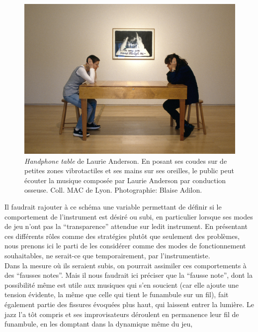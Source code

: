 \begin{figure}[!htbp]
	\captionsetup{format=plain}%
	\includegraphics[width=\linewidth]{gfx/03_gesture/laurie-anderson-the-handphone-table.jpg}
	\caption[\textit{Handphone table} de Laurie Anderson]{\textit{Handphone table} de Laurie Anderson. En posant ses coudes sur de petites zones vibrotactiles et ses mains sur ses oreilles, le public peut écouter la musique composée par Laurie Anderson par conduction osseuse. Coll. MAC de Lyon. Photographie: Blaise Adilon.}
	\label{fig:gesture:HandphoneTable}
\end{figure}
\indent Il faudrait rajouter à ce schéma une variable permettant de définir si le comportement de l'instrument est désiré ou subi, en particulier lorsque ses modes de jeu n'ont pas la ``transparence'' attendue sur ledit instrument. En présentant ces différents rôles comme des stratégies plutôt que seulement des problèmes, nous prenons ici le parti de les considérer comme des modes de fonctionnement souhaitables, ne serait-ce que temporairement, par l'instrumentiste.\\
\indent Dans la mesure où ils seraient subis, on pourrait assimiler ces comportements à des ``fausses notes''. Mais il nous faudrait ici préciser que la ``fausse note'', dont la possibilité même est utile aux musiques qui s'en soucient (car elle ajoute une tension évidente, la même que celle qui tient le funambule sur un fil), fait également partie des fissures évoquées plus haut, qui laissent entrer la lumière. Le jazz l'a tôt compris et ses improvisateurs déroulent en permanence leur fil de funambule, en les domptant dans la dynamique même du jeu,
